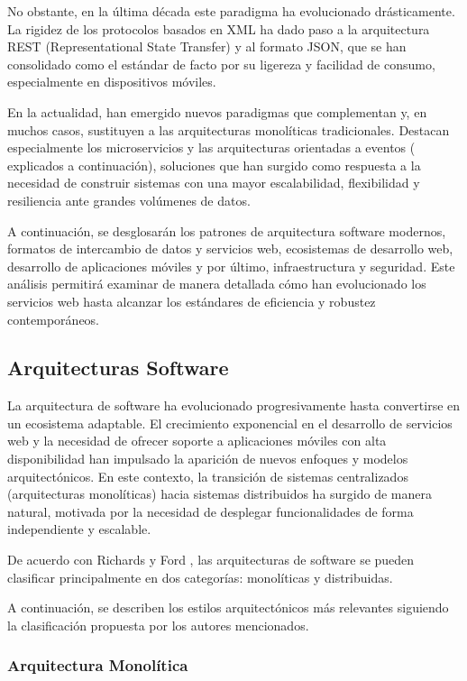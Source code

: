 No obstante, en la última década este paradigma ha evolucionado drásticamente. La rigidez de los protocolos basados 
en XML ha dado paso a la arquitectura REST (Representational State Transfer) y al formato JSON, que se han consolidado
como el estándar de facto por su ligereza y facilidad de consumo, especialmente en dispositivos móviles.

En la actualidad, han emergido nuevos paradigmas que complementan y, en muchos casos, sustituyen a las arquitecturas 
monolíticas tradicionales. Destacan especialmente los microservicios y las arquitecturas orientadas a eventos (
explicados a continuación), soluciones que han surgido como respuesta a la necesidad de construir sistemas con una 
mayor escalabilidad, flexibilidad y resiliencia ante grandes volúmenes de datos.

A continuación, se desglosarán los patrones de arquitectura software modernos, formatos de intercambio de datos y  
servicios web, ecosistemas de desarrollo web, desarrollo de aplicaciones móviles y por último, infraestructura
y seguridad. Este análisis permitirá examinar de manera detallada cómo han evolucionado los servicios web hasta 
alcanzar los estándares de eficiencia y robustez contemporáneos.

\subsection{Arquitecturas Software}

La arquitectura de software ha evolucionado progresivamente hasta convertirse en un ecosistema adaptable. El 
crecimiento exponencial en el desarrollo de servicios web y la necesidad de ofrecer soporte a aplicaciones móviles 
con alta disponibilidad han impulsado la aparición de nuevos enfoques y modelos arquitectónicos. En este contexto, 
la transición de sistemas centralizados (arquitecturas monolíticas) hacia sistemas distribuidos ha surgido de manera 
natural, motivada por la necesidad de desplegar funcionalidades de forma independiente y escalable.

De acuerdo con Richards y Ford \cite{libroArquitecturasSoftware}, las arquitecturas de software se pueden clasificar 
principalmente en dos categorías: monolíticas y distribuidas.

A continuación, se describen los estilos arquitectónicos más relevantes siguiendo la clasificación propuesta por los 
autores mencionados.

\subsubsection{Arquitectura Monolítica}

